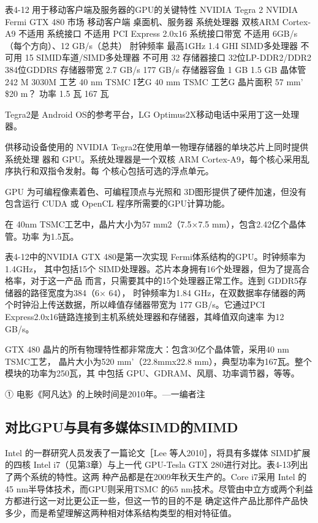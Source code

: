 表4-12 用于移动客户端及服务器的GPU的关键特性
NVIDIA Tegra 2
NVIDIA Fermi GTX 480
市场
移动客户端
桌面机、服务器
系统处理器
双核ARM Cortex-A9
不适用
系统接口
不适用
PCI Express 2.0x16
系统接口带宽
不适用
6GB/s（每个方向）、12 GB/s（总共）
肘钟频率
最高1GHz
1.4 GHI
SIMD多处理器
不可用
15
SIMID车道/SIMD多处理器
不可用
32
存储器接口
32位LP-DDR2/DDR2
384位GDDRS
存储器带宽
2.7 GB/s
177 GB/s
存储器容鱼
1 GB
1.5 GB
晶体管
242 M
3030M
工艺
40 nm TSMC I艺G
40 mm TSMC 工艺G
晶片面积
57 mm'
\$20 m？
功率
1.5 瓦
167 瓦

 Tegra2是 Android OS的参考平台，LG Optimus2X移动电话中采用丁这一处理器。

供移动设备使用的 NVIDIA Tegra2在使用单一物理存储器的单块芯片上同时提供系统处理
器和 GPU。系统处理器是一个双核 ARM Cortex-A9，每个核心采用乱序执行和双指令发射。每
个核心包括可选的浮点单元。

GPU 为可编程像素着色、可编程顶点与光照和 3D图形提供了硬件加速，但没有包含运行
CUDA 或 OpenCL 程序所需要的GPU计算功能。

在 40nm TSMC工艺中，晶片大小为57 mm2（7.5×7.5 mm），包含2.42亿个晶体管。功率
为1.5瓦。

表4-12中的NVIDIA GTX 480是第一次实现 Fermi体系结构的GPU。时钟频率为1.4GHz，
其中包括15个 SIMD处理器。芯片本身拥有16个处理器，但为了提高合格率，对于这一产品
而言，只需要其中的15个处理器正常工作。连到 GDDR5存储器的路径宽度为384（6× 64），
时钟频率为1.84 GHz，在双数据率存储器的两个时钟沿上传送数据，所以峰值存储器带宽为
177 GB/s。它通过PCI Express2.0x16链路连接到主机系统处理器和存储器，其峰值双向速率
为12 GB/s。

GTX 480 晶片的所有物理特性都非常庞大：包含30亿个晶体管，采用40 nm TSMC工艺，
晶片大小为520 mm’（22.8mmx22.8 mm），典型功率为167瓦。整个模块的功率为250瓦，其
中包括 GPU、GDRAM、风扇、功率调节器，等等。

① 电影《阿凡达》的上映时间是2010年。—一编者注

\subsection{对比GPU与具有多媒体SIMD的MIMD}
Intel 的一群研究人员发表了一篇论文［Lee 等人2010］，将具有多媒体 SIMD扩展的四核 Intel
i7（见第3章）与上一代 GPU-Tesla GTX 280进行对比。表4-13列出了两个系统的特性。这两
种产品都是在2009年秋天生产的。Core i7采用 Intel 的45 nm半导体技术，而GPU则采用TSMC
的65 nm技术。尽管由中立方或两个利益方都进行这一对比更公正一些，但这一节的目的不是
确定这件产品比那件产品快多少，而是希望理解这两种相对体系结构类型的相对特征值。

